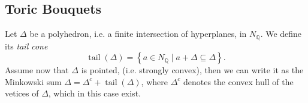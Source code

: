 \documentclass[a4paper]{article}
\DeclareMathOperator{\tail}{tail}
\theoremstyle{definition}
\begin{document}
  \subsection{Toric Bouquets}
  Let $\Delta$ be a polyhedron, i.e. a finite intersection of hyperplanes, in $N_{\mathbb{Q}}$. We define its \emph{tail cone} 
  \[
    \tail \left( \Delta \right) = \left\{a \in N_{\mathbb{Q}} \mid a + \Delta \subseteq \Delta\right\}.
  \]
  Assume now that $\Delta$ is pointed, (i.e. strongly convex), then we can write it as the Minkowski sum  $\Delta = \Delta ^{c} + \tail \left( \Delta \right)$, where $\Delta ^{c}$ denotes the convex hull of the vetices of $\Delta$, which in this case exist.
  
  
  
\end{document}
